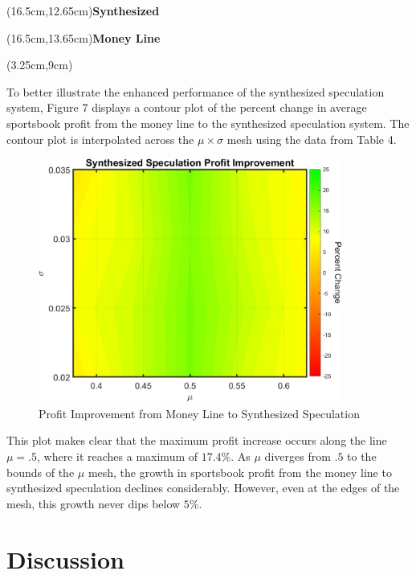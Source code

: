 \documentclass[sn-mathphys-num]{sn-jnl}
\theoremstyle{thmstyleone}%
\theoremstyle{thmstyletwo}%
\theoremstyle{thmstylethree}%
\begin{document}
\begin{textblock*}{7cm}(16.5cm,12.65cm)\textbf{Synthesized} \end{textblock*} 
\begin{textblock*}{7cm}(16.5cm,13.65cm)\textbf{Money Line} \end{textblock*} 
\begin{textblock*}{7cm}(3.25cm,9cm)  \end{textblock*}

To better illustrate the enhanced performance of the synthesized speculation system, Figure 7 displays a contour plot of the percent change in average sportsbook profit from the money line to the synthesized speculation system. The contour plot is interpolated across the $\mu \times \sigma$ mesh using the data from Table 4. 

\begin{figure}[H]
	\centering
	\includegraphics[width=10cm]{Profit Contour}
	\caption{Profit Improvement from Money Line to Synthesized Speculation}
\end{figure}

This plot makes clear that the maximum profit increase occurs along the line $\mu = .5$, where it reaches a maximum of $17.4\%$. As $\mu$ diverges from $.5$ to the bounds of the $\mu$ mesh, the growth in sportsbook profit from the money line to synthesized speculation declines considerably. However, even at the edges of the mesh, this growth never dips below $5\%$. 

\section{Discussion}
\end{document}
